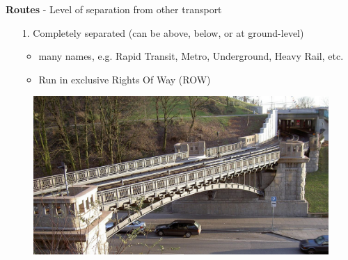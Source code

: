 \documentclass[aspectratio=169]{beamer}
\begin{document}
\begin{frame}
	
	\textbf{Routes} - Level of separation from other transport
	
	
	\begin{itemize}
		
		\item[1.] Completely separated (can be above, below, or at ground-level)
		
		\begin{itemize}
			\item many names, e.g. Rapid Transit, Metro, Underground, Heavy Rail, etc.
			\item Run in exclusive Rights Of Way (ROW)
		\end{itemize}
		
	\end{itemize}

	\begin{figure}
		\centering
		\includegraphics[width=0.7\linewidth]{images/hamburg.png}
	\end{figure}

	
	
\end{frame}
\end{document}
